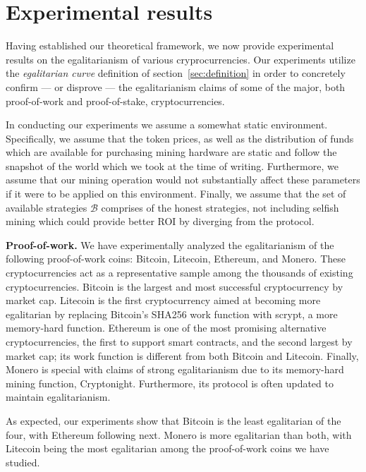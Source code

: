 \section{Experimental results}\label{sec:experiments}

Having established our theoretical framework, we now provide experimental
results on the egalitarianism of various cryprocurrencies. Our experiments
utilize the \emph{egalitarian curve} definition of section~\ref{sec:definition}
in order to concretely confirm --- or disprove --- the egalitarianism claims of
some of the major, both proof-of-work and proof-of-stake, cryptocurrencies.

In conducting our experiments we assume a somewhat static environment.
Specifically, we assume that the token prices, as well as the distribution of
funds which are available for purchasing mining hardware are static and follow
the snapshot of the world which we took at the time of writing. Furthermore, we
assume that our mining operation would not substantially affect these
parameters if it were to be applied on this environment. Finally, we assume
that the set of available strategies $\mathcal{B}$ comprises of the honest
strategies, \eg not including selfish mining which could provide better ROI
by diverging from the protocol.

\noindent\textbf{Proof-of-work.}
\noindent
We have experimentally analyzed the egalitarianism of the following
proof-of-work coins: Bitcoin, Litecoin, Ethereum, and Monero. These
cryptocurrencies act as a representative sample among the thousands of existing
cryptocurrencies. Bitcoin is the largest and most successful cryptocurrency by
market cap. Litecoin is the first cryptocurrency aimed at becoming more
egalitarian by replacing Bitcoin's SHA256 work function with scrypt, a more
memory-hard function. Ethereum is one of the most promising alternative
cryptocurrencies, the first to support smart contracts, and the second largest
by market cap; its work function is different from both Bitcoin and Litecoin.
Finally, Monero is special with claims of strong egalitarianism due to its
memory-hard mining function, Cryptonight. Furthermore, its protocol is often
updated to maintain egalitarianism.

As expected, our experiments show that Bitcoin is the least egalitarian of the
four, with Ethereum following next. Monero is more egalitarian than both, with
Litecoin being the most egalitarian among the proof-of-work coins
we have studied. 

